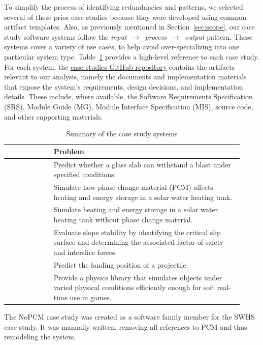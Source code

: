 To simplify the process of identifying redundancies and patterns, we selected
several of these prior case studies because they were developed using common
artifact templates. Also, as previously mentioned in Section~\ref{sec:scope},
our case study software systems follow the
\mbox{\emph{input~$\rightarrow$~process~$\rightarrow$~output}} pattern. These
systems cover a variety of use cases, to help avoid over-specializing into one
particular system type. Table~\ref{tab:case-studies} provides a high-level
reference to each case study. For each system, the
\href{https://github.com/smiths/caseStudies}{case studies GitHub repository} 
contains the
artifacts relevant to our analysis, namely the documents and implementation
materials that expose the system's requirements, design decisions, and
implementation details. These include, where available, the Software
Requirements Specification (SRS), Module Guide (MG), Module Interface
Specification (MIS), source code, and other supporting materials.

\begin{table}
\centering
\caption{Summary of the case study systems}
\label{tab:case-studies}
\begin{tabular}{|p{0.18\linewidth}|p{0.74\linewidth}|}
\hline
\textbf{\rule{0pt}{4.5ex}Case study} & \textbf{Problem} \\
\hline
\rule{0pt}{4.5ex}\gb{} & Predict whether a glass slab can withstand a blast 
under specified conditions. \\
\hline
\rule{0pt}{4.5ex}\sw{} & Simulate how phase change material (PCM) affects 
heating and energy storage in a solar water heating tank. \\
\hline
\rule{0pt}{4.5ex}\np{} & Simulate heating and energy storage in a solar 
water heating tank without phase change material. \\
\hline
\rule{0pt}{4.5ex}\sp{} & Evaluate slope stability by identifying the critical 
slip surface and determining the associated factor of safety and interslice 
forces. \\
\hline
\rule{0pt}{4.5ex}\pr{} & Predict the landing position of a projectile. \\
\hline
\rule{0pt}{4.5ex}\gp{} & Provide a physics library that simulates objects under 
varied physical conditions efficiently enough for soft real-time use in games. 
\\
\hline
\end{tabular}
\end{table}

The NoPCM case study was created as a software family member for the SWHS case
study. It was manually written, removing all references to PCM and thus 
remodeling the system.

